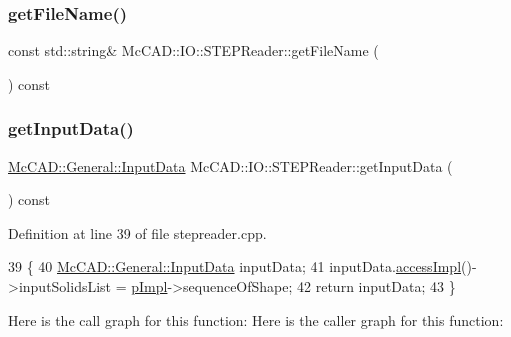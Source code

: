 \subsubsection{\texorpdfstring{get\+File\+Name()}{getFileName()}\hspace{0.1cm}{\footnotesize\ttfamily [2/2]}}
{\footnotesize\ttfamily const std\+::string\& Mc\+C\+A\+D\+::\+I\+O\+::\+S\+T\+E\+P\+Reader\+::get\+File\+Name (\begin{DoxyParamCaption}{ }\end{DoxyParamCaption}) const}

\mbox{\label{classMcCAD_1_1IO_1_1STEPReader_a2c2f8e3747b56a13713ad8507334d4d4}} 
\subsubsection{\texorpdfstring{get\+Input\+Data()}{getInputData()}\hspace{0.1cm}{\footnotesize\ttfamily [1/2]}}
{\footnotesize\ttfamily \hyperlink{classMcCAD_1_1General_1_1InputData}{Mc\+C\+A\+D\+::\+General\+::\+Input\+Data} Mc\+C\+A\+D\+::\+I\+O\+::\+S\+T\+E\+P\+Reader\+::get\+Input\+Data (\begin{DoxyParamCaption}{ }\end{DoxyParamCaption}) const}



Definition at line 39 of file stepreader.\+cpp.


\begin{DoxyCode}
39                                      \{
40   \hyperlink{classMcCAD_1_1General_1_1InputData}{McCAD::General::InputData} inputData;
41   inputData.\hyperlink{classMcCAD_1_1General_1_1InputData_aefaf94de8ee1317c3db7f45da3e3b0ce}{accessImpl}()->inputSolidsList = \hyperlink{classMcCAD_1_1IO_1_1STEPReader_a3bbb72987d6bad33c403c85401c62160}{pImpl}->sequenceOfShape;
42   \textcolor{keywordflow}{return} inputData;
43 \}
\end{DoxyCode}
Here is the call graph for this function\+:
Here is the caller graph for this function\+:
\mbox{\label{classMcCAD_1_1IO_1_1STEPReader_ae9670930a1309ec29c1c030204e4cbf4}} 
